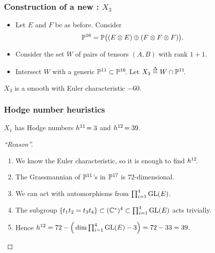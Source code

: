 \begin{frame}
    \frametitle{Construction of a new \CY: $X_3$}

    \begin{itemize}
    	\item
    	Let $E$ and $F$ be as before. Consider
        \[
            \P^{16} = \P\big((E \otimes E) \oplus (F \otimes F \otimes F)\big).
        \]
        
        \item
        Consider the set $W$ of pairs of tensors $(A, B)$ with rank $1 + 1$.

        \item
        Intersect $W$ with a generic $\P^{11} \subset \P^{16}\mkern-4mu$. Let $X_3 \defeq  W \cap \P^{11}\mkern-4mu$.
    \end{itemize}

    \begin{theorem}
        $X_3$ is a smooth \CY with Euler characteristic $-60$.
    \end{theorem}
\end{frame}


\begin{frame}
    \frametitle{Hodge number heuristics}

    \begin{conjecture}
        $X_1$ has Hodge numbers $h^{11}\mkern-3mu = 3$ and $h^{12}\mkern-2mu = 39$.
    \end{conjecture}

    \begin{proof}[``Reason'']
        \begin{enumerate}[<+->]
            \item
	        We know the Euler characteristic, so it is enough to find $h^{12}\mkern-4mu$.

            \item
            The Grassmannian of $\P^{11}$'s in $\P^{17}$ is $72$-dimensional.

            \item
            We can act with automorphisms from $\prod_{i = 1}^4 \GL(E)$.

            \item
            The subgroup $\{ t_1t_2 = t_3t_4 \} \subset (\C^\ast)^4 \subset \prod_{i = 1}^4 \GL(E)$ acts trivially.
            \vspace*{-0.5ex}

            \item
            Hence $h^{12} = 72 - \Big(\dim \prod_{i = 1}^4 \GL(E) - 3\Big) = 72-33 = 39$.
            \qedhere
        \end{enumerate}
    \end{proof}
\end{frame}
